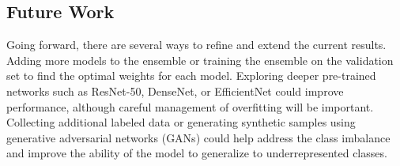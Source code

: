 \subsection{Future Work}

Going forward, there are several ways to refine and extend the current results. Adding more models to the ensemble or training the ensemble on the validation set to find the optimal weights for each model. Exploring deeper pre-trained networks such as ResNet-50, DenseNet, or EfficientNet could improve performance, although careful management of overfitting will be important. Collecting additional labeled data or generating synthetic samples using generative adversarial networks (GANs) could help address the class imbalance and improve the ability of the model to generalize to underrepresented classes.
